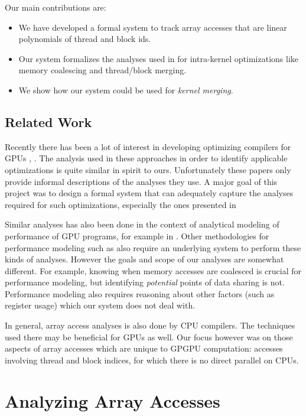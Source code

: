 \documentclass{article}
\renewcommand{\|}{\:|\:}
\begin{document}
Our main contributions are: 
\begin{itemize}
  \item We have developed a formal system to track array accesses that are linear polynomials of thread and block ids.
  \item Our system formalizes the analyses used in \cite{pldi10} for intra-kernel optimizations like memory coalescing and thread/block merging.
  \item We show how our system could be used for \emph{kernel merging}.
\end{itemize}

\subsection{Related Work}
Recently there has been a lot of interest in developing optimizing compilers for GPUs \cite{pldi10}, \cite{cuda-lite}. The analysis used in these approaches in order to identify applicable optimizations is quite similar in spirit to ours. Unfortunately these papers only provide informal descriptions of the analyses they use. A major goal of this project was to design a formal system that can adequately capture the analyses required for such optimizations, especially the ones presented in \cite{pldi10}

Similar analyses has also been done in the context of analytical modeling of performance of GPU programs, for example in \cite{adaptive}. Other methodologies for performance modeling such as \cite{analytical} also require an underlying system to perform these kinds of analyses. However the goals and scope of our analyses are somewhat different. For example, knowing when memory accesses are coalesced is crucial for performance modeling, but identifying \emph{potential} points of data sharing is not. Performance modeling also requires reasoning about other factors (such as register usage) which our system does not deal with.

In general, array access analyses is also done by CPU compilers. The techniques used there may be beneficial for GPUs as well. Our focus however was on those aspects of array accesses which are unique to GPGPU computation: accesses involving thread and block indices, for which there is no direct parallel on CPUs.


\section{Analyzing Array Accesses}
\end{document}
